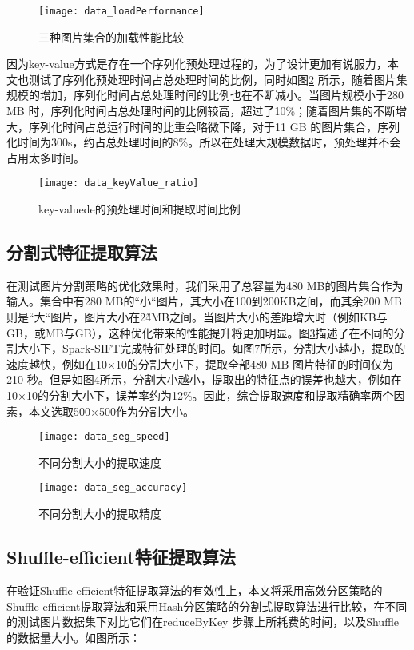 \begin{figure}[htp]
\centering
\texttt{[image: data\_loadPerformance]}
\caption{三种图片集合的加载性能比较}
\label{fig:data_loadPerformance}
\end{figure}
因为key-value方式是存在一个序列化预处理过程的，为了设计更加有说服力，本文也测试了序列化预处理时间占总处理时间的比例，同时如图\ref{fig:data_keyValue_ratio} 所示，随着图片集规模的增加，序列化时间占总处理时间的比例也在不断减小。当图片规模小于280 MB 时，序列化时间占总处理时间的比例较高，超过了10\%；随着图片集的不断增大，序列化时间占总运行时间的比重会略微下降，对于11 GB 的图片集合，序列化时间为300s，约占总处理时间的8\%。所以在处理大规模数据时，预处理并不会占用太多时间。
\begin{figure}[htp]
\centering
\texttt{[image: data\_keyValue\_ratio]}
\caption{key-valuede的预处理时间和提取时间比例}
\label{fig:data_keyValue_ratio}
\end{figure}

\subsection{分割式特征提取算法}
在测试图片分割策略的优化效果时，我们采用了总容量为480 MB的图片集合作为输入。集合中有280 MB的``小``图片，其大小在100到200KB之间，而其余200 MB则是``大``图片，图片大小在2\~4MB之间。当图片大小的差距增大时（例如KB与GB，或MB与GB），这种优化带来的性能提升将更加明显。图\ref{fig:data_seg_speed}描述了在不同的分割大小下，Spark-SIFT完成特征处理的时间。如图7所示，分割大小越小，提取的速度越快，例如在10×10的分割大小下，提取全部480 MB 图片特征的时间仅为210 秒。但是如图\ref{fig:data_seg_accuracy}所示，分割大小越小，提取出的特征点的误差也越大，例如在10×10的分割大小下，误差率约为12\%。因此，综合提取速度和提取精确率两个因素，本文选取500×500作为分割大小。
\begin{figure}[htp]
\centering
\texttt{[image: data\_seg\_speed]}
\caption{不同分割大小的提取速度}
\label{fig:data_seg_speed}
\end{figure}

\begin{figure}[htp]
\centering
\texttt{[image: data\_seg\_accuracy]}
\caption{不同分割大小的提取精度}
\label{fig:data_seg_accuracy}
\end{figure}

\subsection{Shuffle-efficient特征提取算法}
在验证Shuffle-efficient特征提取算法的有效性上，本文将采用高效分区策略的Shuffle-efficient提取算法和采用Hash分区策略的分割式提取算法进行比较，在不同的测试图片数据集下对比它们在reduceByKey 步骤上所耗费的时间，以及Shuffle的数据量大小。如图所示：

